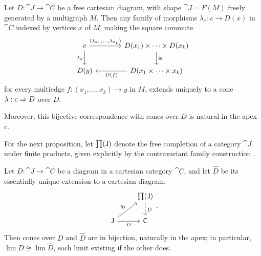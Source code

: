\documentclass[11pt]{article}
\numberwithin{equation}{section}
\begin{document}
\begin{proposition}
  \label{prop:cones-free-cartesian-diagram}
  Let $D: \cat{J} \to \cat{C}$ be a free cartesian diagram, with shape
  $\cat{J} = F(M)$ freely generated by a multigraph $M$. Then any family of
  morphisms ${\lambda_x: c \to D(x)}$ in $\cat{C}$ indexed by vertices $x$ of
  $M$, making the square commute
  \begin{equation*}
    \begin{tikzcd}[column sep=large]
      c & {D(x_1) \times \cdots \times D(x_k)} \\
      {D(y)} & {D(x_1 \times \cdots \times x_k)}
      \arrow["{\langle \lambda_{x_1}, \dots, \lambda_{x_k} \rangle}", from=1-1, to=1-2]
      \arrow["{\lambda_y}"', from=1-1, to=2-1]
      \arrow["\cong", from=1-2, to=2-2]
      \arrow["{D(f)}", from=2-2, to=2-1]
    \end{tikzcd}
  \end{equation*}
  for every multiedge $f: (x_1, \dots, x_k) \to y$ in $M$, extends uniquely to a
  cone $\lambda: c \Rightarrow D$ over $D$.

  Moreover, this bijective correspondence with cones over $D$ is natural in the
  apex $c$.
\end{proposition}

For the next proposition, let $\mathop{\textstyle\prod}(\mathsf{J})$ denote the free completion of a
category $\cat{J}$ under finite products, given explicitly by the contravariant
family construction \cite[e.g.,][\mbox{Remark 1.15}]{adamek2011}.

\begin{proposition}
  \label{prop:limit-free-product-completion}
  Let $D: \cat{J} \to \cat{C}$ be a diagram in a cartesian category $\cat{C}$, and
  let $\hat D$ be its essentially unique extension to a cartesian diagram:
  \begin{equation*}
    \begin{tikzcd}
      & {\ProdComp(\cat{J})} \\
      {\cat{J}} & {\cat{C}}
      \arrow["{\hat D}", dashed, from=1-2, to=2-2]
      \arrow["{\eta_{\cat{J}}}", from=2-1, to=1-2]
      \arrow["D"', from=2-1, to=2-2]
    \end{tikzcd}.
  \end{equation*}
  Then cones over $D$ and $\hat D$ are in bijection, naturally in the apex; in
  particular, $\lim D \cong \lim \hat D$, each limit existing if the other does.
\end{proposition}
\end{document}
